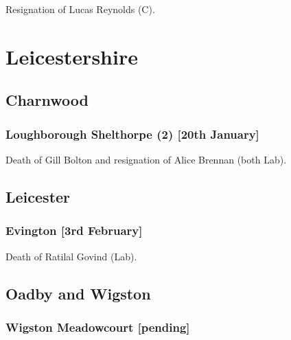 \documentclass[a4paper,openany]{book}
\begin{document}
\begin{resultsiii}

Resignation of Lucas Reynolds (C).

\section{Leicestershire}

\subsection*{Charnwood}

\subsubsection*{Loughborough Shelthorpe (2) \hspace*{\fill}\nolinebreak[1]%
	\enspace\hspace*{\fill}
	[20th January]}


Death of Gill Bolton and resignation of Alice Brennan (both Lab).

\subsection*{Leicester}

\subsubsection*{Evington \hspace*{\fill}\nolinebreak[1]%
	\enspace\hspace*{\fill}
	[3rd February]}


Death of Ratilal Govind (Lab).

\subsection*{Oadby and Wigston}

\subsubsection*{Wigston Meadowcourt \hspace*{\fill}\nolinebreak[1]%
	\enspace\hspace*{\fill}
	[pending]}


\end{resultsiii}
\end{document}

